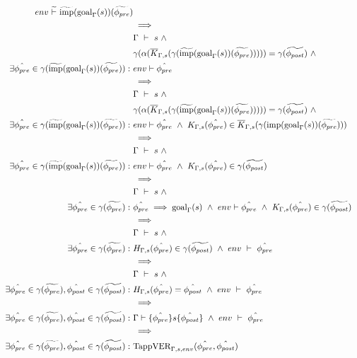 \documentclass[11pt,a4paper]{article}
\begin{document}
\begin{description}
\begin{align*}
	env \gdash \grad{\imp}(\goal(s))(\grad{\phi_{pre}})\\
&\implies\\
	&\Gamma ~\vdash~ s ~\wedge~\\
	&\gamma(\alpha(\overline{K}_{\Gamma, s}(\gamma(\grad{\imp}(\goal(s))(\grad{\phi_{pre}}))))) = \gamma(\grad{\phi_{post}}) ~\wedge~\\
	\exists \hat{\phi_{pre}} \in \gamma(\grad{\imp}(\goal(s))(\grad{\phi_{pre}})) : ~
	&env \vdash \hat{\phi_{pre}}\\
&\implies\\
	&\Gamma ~\vdash~ s ~\wedge~\\
	&\gamma(\alpha(\overline{K}_{\Gamma, s}(\gamma(\grad{\imp}(\goal(s))(\grad{\phi_{pre}}))))) = \gamma(\grad{\phi_{post}}) ~\wedge~\\
	\exists \hat{\phi_{pre}} \in \gamma(\grad{\imp}(\goal(s))(\grad{\phi_{pre}})) : ~
	&env \vdash \hat{\phi_{pre}} ~\wedge~
	K_{\Gamma, s}(\hat{\phi_{pre}}) \in \overline{K}_{\Gamma, s}(\gamma(\imp(\goal(s))(\grad{\phi_{pre}}))) \\
&\implies\\
	&\Gamma ~\vdash~ s ~\wedge~\\
	\exists \hat{\phi_{pre}} \in \gamma(\grad{\imp}(\goal(s))(\grad{\phi_{pre}})) : ~
	& env \vdash \hat{\phi_{pre}} ~\wedge~
	K_{\Gamma, s}(\hat{\phi_{pre}}) \in \gamma(\grad{\phi_{post}}) \\
&\implies\\ %
	&\Gamma ~\vdash~ s ~\wedge~\\
	\exists \hat{\phi_{pre}} \in \gamma(\grad{\phi_{pre}}) : ~
	& \hat{\phi_{pre}} \implies \goal(s) ~\wedge~
	env \vdash \hat{\phi_{pre}} ~\wedge~
	K_{\Gamma, s}(\hat{\phi_{pre}}) \in \gamma(\grad{\phi_{post}}) \\
&\implies\\
	&\Gamma ~\vdash~ s ~\wedge~\\
	\exists \hat{\phi_{pre}} \in \gamma(\grad{\phi_{pre}}) : ~
	&H_{\Gamma, s}(\hat{\phi_{pre}}) \in \gamma(\grad{\phi_{post}}) ~\wedge~
	env ~\vdash~ \hat{\phi_{pre}}\\
&\implies\\
	&\Gamma ~\vdash~ s ~\wedge~\\
	\exists \hat{\phi_{pre}} \in \gamma(\grad{\phi_{pre}}), \hat{\phi_{post}} \in \gamma(\grad{\phi_{post}}) : ~
	&H_{\Gamma, s}(\hat{\phi_{pre}}) = \hat{\phi_{post}} ~\wedge~
	env ~\vdash~ \hat{\phi_{pre}}\\
&\implies\\
	\exists \hat{\phi_{pre}} \in \gamma(\grad{\phi_{pre}}), \hat{\phi_{post}} \in \gamma(\grad{\phi_{post}}) : ~
	&\Gamma \hoare {\hat{\phi_{pre}}} {s} {\hat{\phi_{post}}} ~\wedge~
	env ~\vdash~ \hat{\phi_{pre}}\\
&\implies\\
	\exists \hat{\phi_{pre}} \in \gamma(\grad{\phi_{pre}}), \hat{\phi_{post}} \in \gamma(\grad{\phi_{post}}) : ~
	&\TappVER_{\Gamma, s, env}(\hat{\phi_{pre}}, \hat{\phi_{post}})
	\end{align*}
	

\end{description}
\end{document}
